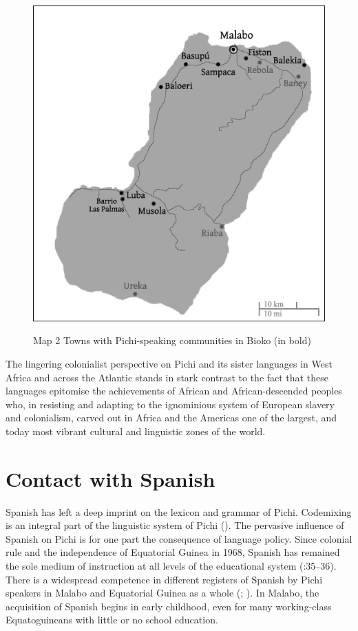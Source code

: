 \begin{figure}
	\caption{Map 2 Towns with Pichi-speaking communities in Bioko (in bold)}
	\includegraphics[width=\textwidth]{figures/yakpomod-img2.png}
	\label{map:1:1.2}
\end{figure}

 


The lingering colonialist perspective on Pichi and its sister languages in West Africa and across the Atlantic stands in stark contrast to the fact that these languages epitomise the achievements of African and African-descended peoples who, in resisting and adapting to the ignominious system of European slavery and colonialism, carved out in Africa and the Americas one of the largest, and today most vibrant cultural and linguistic zones of the world.

\section{Contact with Spanish}\label{sec:1.2}

Spanish has left a deep imprint on the lexicon and grammar of Pichi. Codemixing is an integral part of the linguistic system of Pichi (\citealt{Yakpo2009complexity,Yakpo2018}). The pervasive influence of Spanish on Pichi is for one part the consequence of language policy. Since colonial rule and the independence of Equatorial Guinea in 1968, Spanish has remained the sole medium of instruction at all levels of the educational system (\citealt{Lipski1992}:35–36). There is a widespread competence in different registers of Spanish by Pichi speakers in Malabo and Equatorial Guinea as a whole (\citealt{Lipski1985}; \citealt{García2016}). In Malabo, the acquisition of Spanish begins in early childhood, even for many working-class Equatoguineans with little or no school education. 


